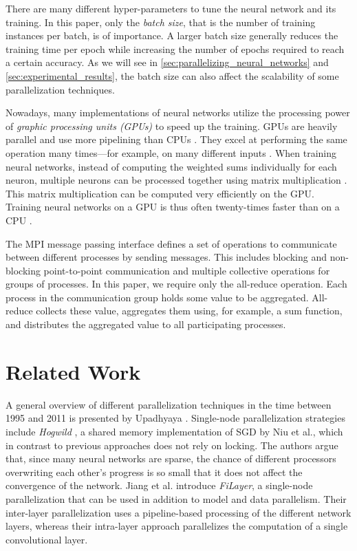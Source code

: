 \documentclass[conference,compsoc,a4paper]{IEEEtran}
\begin{document}
There are many different hyper-parameters to tune the neural network and its training.
In this paper, only the \emph{batch size}, that is the number of training instances per batch, is of importance.
A larger batch size generally reduces the training time per epoch while increasing the number of epochs required to reach a certain accuracy.
As we will see in \autoref{sec:parallelizing_neural_networks} and \ref{sec:experimental_results}, the batch size can also affect the scalability of some parallelization techniques.

Nowadays, many implementations of neural networks utilize the processing power of \emph{graphic processing units (GPUs)} to speed up the training.
GPUs are heavily parallel and use more pipelining than CPUs \cite{oh2004gpu}.
They excel at performing the same operation many times---for example, on many different inputs \cite{oh2004gpu}.
When training neural networks, instead of computing the weighted sums individually for each neuron, multiple neurons can be processed together using matrix multiplication \cite{oh2004gpu}.
This matrix multiplication can be computed very efficiently on the GPU.
Training neural networks on a GPU is thus often twenty-times faster than on a CPU \cite{oh2004gpu,strigl2010performance}.

The MPI message passing interface \cite{walker1996mpi} defines a set of operations to communicate between different processes by sending messages.
This includes blocking and non-blocking point-to-point communication and multiple collective operations for groups of processes.
In this paper, we require only the all-reduce operation.
Each process in the communication group holds some value to be aggregated.
All-reduce collects these value, aggregates them using, for example, a sum function, and distributes the aggregated value to all participating processes.


\section{Related Work} %
\label{sec:related_work}
A general overview of different parallelization techniques in the time between 1995 and 2011 is presented by Upadhyaya \cite{upadhyaya2013parallel}.
%
Single-node parallelization strategies include \emph{Hogwild} \cite{recht2011-Hogwild}, a shared memory implementation of SGD by Niu et al., which in contrast to previous approaches does not rely on locking.
The authors argue that, since many neural networks are sparse, the chance of different processors overwriting each other's progress is so small that it does not affect the convergence of the network.
%
Jiang et al. \cite{jiang2018-FiLayer} introduce \emph{FiLayer}, a single-node parallelization that can be used in addition to model and data parallelism.
Their inter-layer parallelization uses a pipeline-based processing of the different network layers, whereas their intra-layer approach parallelizes the computation of a single convolutional layer.
\end{document}
